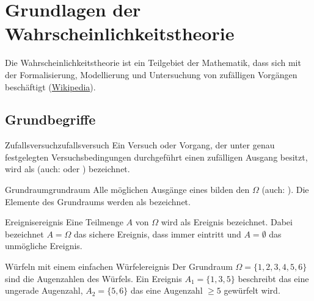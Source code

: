 \chapter{Grundlagen der Wahrscheinlichkeitstheorie}

Die Wahrscheinlichkeitstheorie ist ein Teilgebiet der Mathematik, dass sich mit
der Formalisierung, Modellierung und Untersuchung von zufälligen Vorgängen
beschäftigt (\href{https://de.wikipedia.org/wiki/Wahrscheinlichkeitstheorie}
{Wikipedia}).

\section{Grundbegriffe}

\begin{definition}{Zufallsversuch}{zufallsversuch}
Ein Versuch oder Vorgang, der unter genau festgelegten Versuchsbedingungen
durchgeführt einen zufälligen Ausgang besitzt, wird als 
(auch:  oder )
bezeichnet.
\end{definition}


\begin{definition}{Grundraum}{grundraum}
Alle möglichen Ausgänge eines 
bilden den  $\Omega$ (auch: ). Die
Elemente des Grundraums werden als  bezeichnet.
\end{definition}


\begin{definition}{Ereignis}{ereignis}
Eine Teilmenge $A$ von $\Omega$ wird als Ereignis bezeichnet. Dabei bezeichnet
$A = \Omega$ das sichere Ereignis, dass immer eintritt und $A = \emptyset$ das
unmögliche Ereignis.
\end{definition}

\begin{example}{Würfeln mit einem einfachen Würfel}{ereignis}
Der Grundraum $\Omega = \{1,2,3,4,5,6\}$
sind die Augenzahlen des Würfels. Ein Ereignis $A_1 = \{1,3,5\}$ beschreibt das
eine ungerade Augenzahl, $A_2 = \{5,6\}$ das
eine Augenzahl $\ge 5$ gewürfelt wird.
\end{example}


